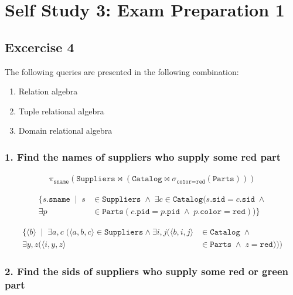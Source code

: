 \section{Self Study 3: Exam Preparation 1}

\subsection{Excercise 4}

The following queries are presented in the following combination:

\begin{enumerate}[noitemsep]
  \item Relation algebra
  \item Tuple relational algebra
  \item Domain relational algebra
\end{enumerate}

\subsubsection{1. Find the names of suppliers who supply some red part}

\begin{align*}
  \pi_{\texttt{sname}}(\texttt{Suppliers} \bowtie (\texttt{Catalog} \bowtie \sigma_{\texttt{color} = \texttt{red}}(\texttt{Parts})))
\end{align*}
 
\begin{align*}
  \{s.\texttt{sname} \; \mid \; s &\in \texttt{Suppliers} \; \wedge \; \exists c \in \texttt{Catalog}(s.\mathtt{sid} = c.\mathtt{sid} \; \wedge \\
\exists p &\in \texttt{Parts}(c.\mathtt{pid} = p.\mathtt{pid} \; \wedge \; p.\mathtt{color} = \mathtt{red}))\} 
\end{align*}

\begin{align*}
  \{\langle b \rangle  \; \mid \; \exists a, c \; (\langle a, b, c \rangle \in \mathtt{Suppliers} \wedge 
    \exists i,j(\langle b,i,j \rangle  &\in \mathtt{Catalog} \; \wedge \\
 \exists y, z(\langle i, y, z \rangle  &\in \mathtt{Parts} \; \wedge \; z = \mathtt{red})
 ))
\end{align*}

\subsubsection{2. Find the sids of suppliers who supply some red or green part}

